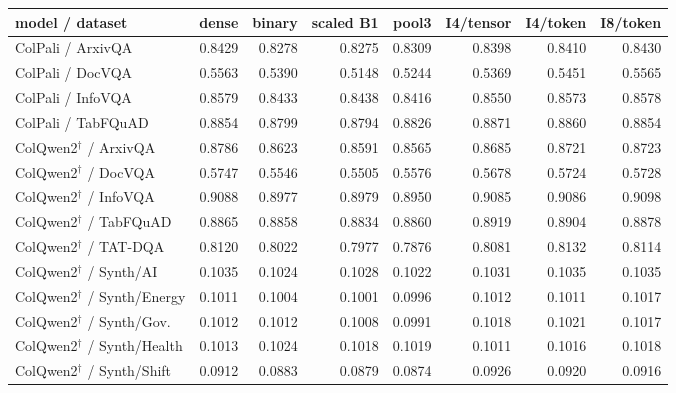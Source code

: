 \begin{tabular}{lrrrrrrr}
\toprule
model / dataset & dense & binary & scaled B1 & pool3 & I4/tensor & I4/token & I8/token \\
\midrule
ColPali / ArxivQA & 0.8429 & 0.8278 & 0.8275 & 0.8309 & 0.8398 & 0.8410 & 0.8430 \\
ColPali / DocVQA & 0.5563 & 0.5390 & 0.5148 & 0.5244 & 0.5369 & 0.5451 & 0.5565 \\
ColPali / InfoVQA & 0.8579 & 0.8433 & 0.8438 & 0.8416 & 0.8550 & 0.8573 & 0.8578 \\
ColPali / TabFQuAD & 0.8854 & 0.8799 & 0.8794 & 0.8826 & 0.8871 & 0.8860 & 0.8854 \\
ColQwen2$^\dagger$ / ArxivQA & 0.8786 & 0.8623 & 0.8591 & 0.8565 & 0.8685 & 0.8721 & 0.8723 \\
ColQwen2$^\dagger$ / DocVQA & 0.5747 & 0.5546 & 0.5505 & 0.5576 & 0.5678 & 0.5724 & 0.5728 \\
ColQwen2$^\dagger$ / InfoVQA & 0.9088 & 0.8977 & 0.8979 & 0.8950 & 0.9085 & 0.9086 & 0.9098 \\
ColQwen2$^\dagger$ / TabFQuAD & 0.8865 & 0.8858 & 0.8834 & 0.8860 & 0.8919 & 0.8904 & 0.8878 \\
ColQwen2$^\dagger$ / TAT-DQA & 0.8120 & 0.8022 & 0.7977 & 0.7876 & 0.8081 & 0.8132 & 0.8114 \\
ColQwen2$^\dagger$ / Synth/AI & 0.1035 & 0.1024 & 0.1028 & 0.1022 & 0.1031 & 0.1035 & 0.1035 \\
ColQwen2$^\dagger$ / Synth/Energy & 0.1011 & 0.1004 & 0.1001 & 0.0996 & 0.1012 & 0.1011 & 0.1017 \\
ColQwen2$^\dagger$ / Synth/Gov. & 0.1012 & 0.1012 & 0.1008 & 0.0991 & 0.1018 & 0.1021 & 0.1017 \\
ColQwen2$^\dagger$ / Synth/Health & 0.1013 & 0.1024 & 0.1018 & 0.1019 & 0.1011 & 0.1016 & 0.1018 \\
ColQwen2$^\dagger$ / Synth/Shift & 0.0912 & 0.0883 & 0.0879 & 0.0874 & 0.0926 & 0.0920 & 0.0916 \\
\bottomrule
\end{tabular}
